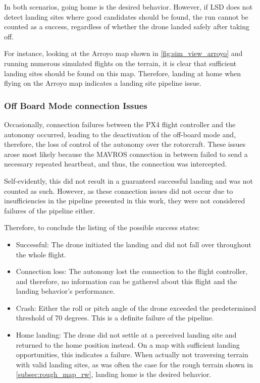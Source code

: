     In both scenarios, going home is the desired behavior. However, if LSD does not detect landing sites where good candidates should be found, the run cannot be counted as a success, regardless of whether the drone landed safely after taking off.

    For instance, looking at the Arroyo map shown in \cref{fig:sim_view_arroyo} and running numerous simulated flights on the terrain, it is clear that sufficient landing sites should be found on this map. Therefore, landing at home when flying on the Arroyo map indicates a landing site pipeline issue.
\subsubsection{Off Board Mode connection Issues}
Occasionally, connection failures between the PX4 flight controller and the autonomy occurred, leading to the deactivation of the off-board mode and, therefore, the loss of control of the autonomy over the rotorcraft. These issues arose most likely because the MAVROS connection in between failed to send a necessary repeated heartbeat, and thus, the connection was intercepted.

Self-evidently, this did not result in a guaranteed successful landing and was not counted as such. However, as these connection issues did not occur due to insufficiencies in the pipeline presented in this work, they were not considered failures of the pipeline either. 

Therefore, to conclude the listing of the possible success states:

\begin{itemize}
    \item Successful: The drone initiated the landing and did not fall over throughout the whole flight.
    \item Connection loss: The autonomy lost the connection to the flight controller, and therefore, no information can be gathered about this flight and the landing behavior's performance.
    \item Crash: Either the roll or pitch angle of the drone exceeded the predetermined threshold of 70 degrees. This is a definite failure of the pipeline.
    \item Home landing: The drone did not settle at a perceived landing site and returned to the home position instead. On a map with sufficient landing opportunities, this indicates a failure. When actually not traversing terrain with valid landing sites, as was often the case for the rough terrain shown in \cref{subsec:rough_map_rw}, landing home is the desired behavior.
\end{itemize}


